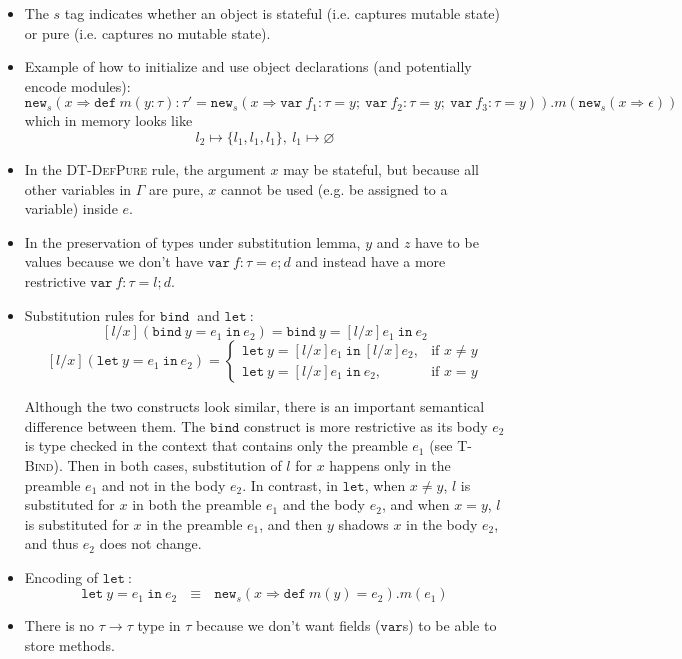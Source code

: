 \documentclass{llncs}
\newcommand{\keywadj}[1]{\mathtt{#1}}
\newcommand{\keyw}[1]{\keywadj{#1}~}
\begin{document}
\begin{itemize}
\item The $s$ tag indicates whether an object is stateful (i.e. captures mutable state) or pure (i.e. captures no mutable state).
\item Example of how to initialize and use object declarations (and potentially encode modules):
\[
\keywadj{new}_{s}(x \Rightarrow \keyw{def} m(y : \tau) : \tau' = \keywadj{new}_{s}(x \Rightarrow \keyw{var} f_1 : \tau = y;~\keyw{var} f_2 : \tau = y;~\keyw{var} f_3 : \tau = y)).m(\keywadj{new}_{s} (x \Rightarrow \epsilon))
\]
which in memory looks like 
\[
l_2 \mapsto \{l_1,l_1,l_1\},~l_1 \mapsto \varnothing
\]
\item In the \textsc{DT-DefPure} rule, the argument $x$ may be stateful, but because all other variables in $\Gamma$ are pure, $x$ cannot be used (e.g. be assigned to a variable) inside $e$.
\item In the preservation of types under substitution lemma, $y$ and $z$ have to be values because we don't have $\keyw{var} f:\tau = e; d$ and instead have a more restrictive $\keyw{var} f:\tau = l;d$.
\item Substitution rules for $\keyw{bind}$ and $\keyw{let}$:
\[
    [l/x](\keyw{bind} y = e_1~\keyw{in} e_2) = \keyw{bind} y = [l/x]e_1~\keyw{in} e_2
\]
\[
    [l/x](\keyw{let} y = e_1~\keyw{in} e_2) = 
\begin{cases}
    \keyw{let} y = [l/x]e_1~\keyw{in} [l/x]e_2, & \text{if } x \not= y\\
    \keyw{let} y = [l/x]e_1~\keyw{in} e_2, & \text{if } x = y
\end{cases}
\]

Although the two constructs look similar, there is an important semantical difference between them. The $\keywadj{bind}$ construct is more restrictive as its body $e_2$ is type checked in the context that contains only the preamble $e_1$ (see \textsc{T-Bind}). Then in both cases, substitution of $l$ for $x$ happens only in the preamble $e_1$ and not in the body $e_2$. In contrast, in $\keywadj{let}$, when $x \not= y$, $l$ is substituted for $x$ in both the preamble $e_1$ and the body $e_2$, and when $x = y$, $l$ is substituted for $x$ in the preamble $e_1$, and then $y$ shadows $x$ in the body $e_2$, and thus $e_2$ does not change. 

\item Encoding of $\keyw{let}$:
\[
\keyw{let} y = e_1~\keyw{in} e_2~~~\equiv~~~\keywadj{new}_s(x \Rightarrow \keyw{def} m(y) = e_2).m(e_1)
\]

\item There is no $\tau \rightarrow \tau$ type in $\tau$ because we don't want fields ($\keywadj{var}$s) to be able to store methods.

\end{itemize}
\end{document}
